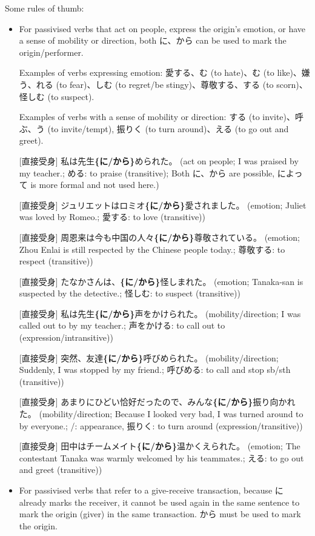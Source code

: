 \documentclass[../nihongo-gakushuu-kyouzai.tex]{subfiles}
\begin{document}
Some rules of thumb:
\begin{itemize}
    \item For passivised verbs that act on people, express the origin's emotion, or  have a sense of mobility or direction, both に、から can be used to mark the origin/performer.

    Examples of verbs expressing emotion: 愛する、む (to hate)、む (to like)、嫌う、れる (to fear)、しむ (to regret/be stingy)、尊敬する、する (to scorn)、怪しむ (to suspect).

    Examples of verbs with a sense of mobility or direction: する (to invite)、呼ぶ、う (to invite/tempt), 振りく (to turn around)、える (to go out and greet).

    [直接受身] 私は先生\textbf{\{に/から\}}められた。 (act on people; I was praised by my teacher.; める: to praise (transitive); Both に、から are possible, によって is more formal and not used here.)

    [直接受身] ジュリエットはロミオ\textbf{\{に/から\}}愛されました。 (emotion; Juliet was loved by Romeo.; 愛する: to love (transitive))

    [直接受身] 周恩来は今も中国の人々\textbf{\{に/から\}}尊敬されている。 (emotion; Zhou Enlai is still respected by the Chinese people today.; 尊敬する: to respect (transitive))

    [直接受身] たなかさんは、\textbf{\{に/から\}}怪しまれた。 (emotion; Tanaka-san is suspected by the detective.; 怪しむ: to suspect (transitive))

    [直接受身] 私は先生\textbf{\{に/から\}}声をかけられた。 (mobility/direction; I was called out to by my teacher.; 声をかける:  to call out to (expression/intransitive))

    [直接受身] 突然、友達\textbf{\{に/から\}}呼びめられた。 (mobility/direction; Suddenly, I was stopped by my friend.; 呼びめる: to call and stop sb/sth (transitive))

    [直接受身] あまりにひどい恰好だったので、みんな\textbf{\{に/から\}}振り向かれた。 (mobility/direction; Because I looked very bad, I was turned around to by everyone.; /: appearance, 振りく: to turn around (expression/transitive))

    [直接受身] 田中はチームメイト\textbf{\{に/から\}}温かくえられた。 (emotion; The contestant Tanaka was warmly welcomed by his teammates.; える: to go out and greet (transitive))
    \item For passivised verbs that refer to a give-receive transaction, because に already marks the receiver, it cannot be used again in the same sentence to mark the origin (giver) in the same transaction. から must be used to mark the origin.


\end{itemize}
\end{document}
